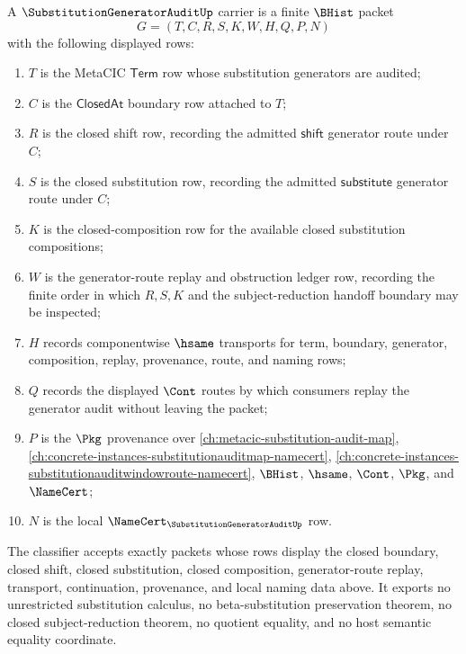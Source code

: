 \begin{definition}
\label{def:substitution-generator-audit-carrier}
A $\SubstitutionGeneratorAuditUp$ carrier is a finite $\BHist$ packet
$$
G=(T,C,R,S,K,W,H,Q,P,N)
$$
with the following displayed rows:
\begin{enumerate}
\item $T$ is the MetaCIC $\mathsf{Term}$ row whose substitution generators are audited;
\item $C$ is the $\mathsf{ClosedAt}$ boundary row attached to $T$;
\item $R$ is the closed shift row, recording the admitted $\mathsf{shift}$ generator route under $C$;
\item $S$ is the closed substitution row, recording the admitted $\mathsf{substitute}$ generator route under $C$;
\item $K$ is the closed-composition row for the available closed substitution compositions;
\item $W$ is the generator-route replay and obstruction ledger row, recording the finite order in which $R,S,K$ and the subject-reduction handoff boundary may be inspected;
\item $H$ records componentwise $\hsame$ transports for term, boundary, generator, composition, replay, provenance, route, and naming rows;
\item $Q$ records the displayed $\Cont$ routes by which consumers replay the generator audit without leaving the packet;
\item $P$ is the $\Pkg$ provenance over \autoref{ch:metacic-substitution-audit-map}, \autoref{ch:concrete-instances-substitutionauditmap-namecert}, \autoref{ch:concrete-instances-substitutionauditwindowroute-namecert}, $\BHist$, $\hsame$, $\Cont$, $\Pkg$, and $\NameCert$;
\item $N$ is the local $\NameCert_{\SubstitutionGeneratorAuditUp}$ row.
\end{enumerate}
The classifier accepts exactly packets whose rows display the closed boundary, closed shift, closed substitution, closed composition, generator-route replay, transport, continuation, provenance, and local naming data above. It exports no unrestricted substitution calculus, no beta-substitution preservation theorem, no closed subject-reduction theorem, no quotient equality, and no host semantic equality coordinate.
\end{definition}

